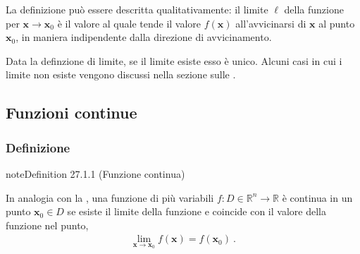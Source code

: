 \documentclass[letterpaper,10pt,italian]{jupyterBook}
\begin{document}
\sphinxAtStartPar
La definizione può essere descritta qualitativamente: il limite \(\ell\) della funzione per \(\mathbf{x} \rightarrow \mathbf{x}_0\) è il valore al quale tende il valore \(f(\mathbf{x})\) all’avvicinarsi di \(\mathbf{x}\) al punto \(\mathbf{x}_0\), in maniera indipendente dalla direzione di avvicinamento.

\sphinxAtStartPar
Data la definzione di limite, se il limite esiste esso è unico. Alcuni casi in cui i limite non esiste vengono discussi nella sezione sulle {\hyperref[\detokenize{ch/multivariable-calculus/limits:multivariable-calculus-discontinuity}]{}}.


\subsection{Funzioni continue}
\label{\detokenize{ch/multivariable-calculus/limits:funzioni-continue}}\label{\detokenize{ch/multivariable-calculus/limits:multivariable-calculus-continuity}}

\subsubsection{Definizione}
\label{\detokenize{ch/multivariable-calculus/limits:definizione}}\label{\detokenize{ch/multivariable-calculus/limits:multivariable-calculus-continuity-def}}\label{ch/multivariable-calculus/limits:multivariable-calculus-continuous-fun}
\begin{sphinxadmonition}{note}{Definition 27.1.1 (Funzione continua)}



\sphinxAtStartPar
In analogia con la {\hyperref[\detokenize{ch/infinitesimal_calculus/analysis:infinitesimal-calculus-limits-def}]{}}, una funzione di più variabili \(f: D \in \mathbb{R}^n \rightarrow \mathbb{R}\) è continua in un punto \(\mathbf{x}_0 \in D\) se esiste il limite della funzione e coincide con il valore della funzione nel punto,
\begin{equation*}
\begin{split}\lim_{\mathbf{x} \rightarrow \mathbf{x}_0} f(\mathbf{x}) = f(\mathbf{x}_0) \ .\end{split}
\end{equation*}\end{sphinxadmonition}
\end{document}

